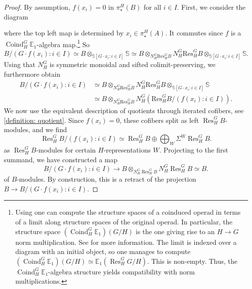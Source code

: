 \documentclass[a4paper, 10pt]{article}
\newcommand{\E}{\mathbb E}  %
\renewcommand{\S}{\mathbb S}
\newcommand{\Res}{\operatorname{Res}}
\newcommand{\Coind}{\operatorname{Coind}}
\theoremstyle{definition}
\begin{document}
\begin{proof}
    By assumption, \(f(x_i)=0\) in \(\pi^H_\star(B)\) for all \(i\in I\). First, we consider the diagram
    \begin{center}
    \end{center}
    where the top left map is determined by $x_i \in \pi_{\star}^H(A)$. It commutes since $f$ is a $\Coind_H^G \E_{1}$-algebra map.\footnote{\label{footnote: Coind}Using \cite[Corollary 1.39]{stewart2025tensorproductsequivariantcommutative} one can compute the structure spaces of a coinduced operad in terms of a limit along structure spaces of the original operad. In particular, the structure space $(\Coind_H^G \E_1)(G/H)$ is the one giving rise to an $H \to G$ norm multiplication. See \cite[Introduction]{stewart2025equivariantoperadssymmetricsequences} for more information. The limit is indexed over a diagram with an initial object, so one manages to compute $(\Coind_{H}^G \E_1)(G/H) \simeq \E_1(\Res_H^G G/H)$. This is non-empty. Thus, the $\Coind_H^G \E_1$-algebra structure yields compatibility with norm multiplications.} So
    \[ B/(G\cdot f(x_i) : i\in I) \simeq B \otimes_{\S[G\cdot x_i : i\in I]}\S \simeq B \otimes_{N^G_H \mathrm{Res}^G_H B} {N^G_H \mathrm{Res}^G_H B}\otimes_{\S[G\cdot x_i : i\in I]}\S. \]
    Using that $N_H^G$ is symmetric monoidal and sifted colimit-preserving, we furthermore obtain
    \begin{align*}
        B/(G\cdot f(x_i) : i\in I) &\simeq B \otimes_{N^G_H \mathrm{Res}^G_H B} {N^G_H \mathrm{Res}^G_H B}\otimes_{\S[G\cdot x_i : i\in I]}\S 
        \\ &\simeq B \otimes_{N^G_H \mathrm{Res}^G_H B} N^G_H\left(\mathrm{Res}^G_H B/( f(x_i) : i\in I)\right).
    \end{align*}
    We now use the equivalent description of quotients through iterated cofibers, see \cref{definition: quotient}. Since $f(x_i) = 0$, these cofibers split as left $\Res_H^G B$-modules, and we find
    \[ \Res_H^G B/(f(x_i) : i \in I) \simeq \Res_H^G B \oplus \bigoplus_{W} \Sigma^{W} \Res_H^G B. \]
    as $\Res_H^G B$-modules for certain $H$-representations $W$. Projecting to the first summand, we have constructed a map
    \[ B/(G\cdot f(x_i) : i\in I) \longrightarrow B \otimes_{N_H^G \Res_H^G B} N_H^G \Res_H^G B \simeq B. \]
    of $B$-modules. By construction, this is a retract of the projection $B \to B/(G \cdot f(x_i) : i \in I)$.
\end{proof}
\end{document}
